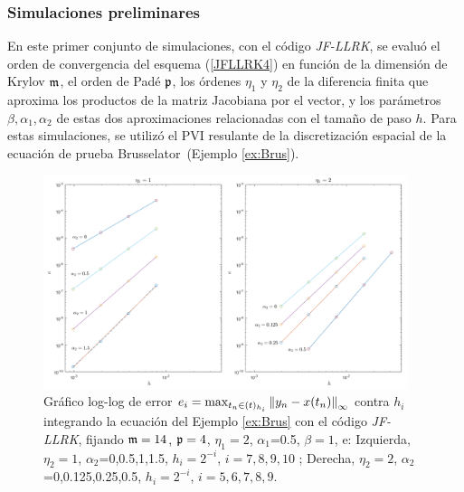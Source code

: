 \subsubsection{Simulaciones preliminares}
En este primer conjunto de simulaciones, con el código \textit{JF-LLRK}, se evaluó el orden de convergencia del esquema (\ref{JFLLRK4}) en función de la dimensión de Krylov $\mathfrak{m}$, el orden de Padé $\mathfrak{p}$, los órdenes $\eta_1$ y $\eta_2$ de la diferencia finita que aproxima los productos de la matriz Jacobiana por el vector, y los parámetros $\beta,\alpha_1,\alpha_2$ de estas dos aproximaciones relacionadas con el tamaño de paso $h$. Para estas simulaciones, se utilizó el PVI resulante de la discretización espacial de la ecuación de prueba  Brusselator~(Ejemplo \ref{ex:Brus}).

\vspace{0.3cm}

\begin{figure}[htb]
	\centering
	\includegraphics[width=0.95\textwidth]{Graphics/lldp-fj/out_new.png}
	\caption{Gráfico log-log de error $e_i=\max_{t_n\in(t)_{h_i}}\left\lVert y_n-x(t_n) \right\rVert_\infty$ contra $h_i$ integrando la ecuación del Ejemplo \ref{ex:Brus} con el código \textit{JF-LLRK}, fijando $\mathfrak{m}=14$, $\mathfrak{p}=4$, $\eta_1=2$, $\alpha_1$=0.5, $\beta=1$, e: Izquierda, $\eta_2=1$, $\alpha_2$=0,0.5,1,1.5, $h_i=2^{-i}$, $i=7,8,9,10$ ; Derecha, $\eta_2=2$, $\alpha_2$=0,0.125,0.25,0.5, $h_i=2^{-i}$, $i=5,6,7,8,9$.}
	\label{Fig2}
\end{figure}

